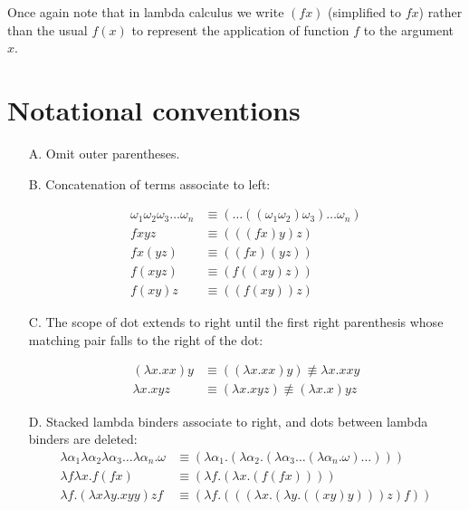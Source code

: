 \documentclass[11pt]{article}
\begin{document}
Once again note that in lambda calculus we write $(f x)$ (simplified to $fx$) rather than the usual $f(x)$
to represent the application of function $f$ to the argument $x$.

\section{Notational conventions}
\label{scnotcon}

\begin{itemize}

\item[A.] Omit outer parentheses.

\item[B.] Concatenation of terms associate to left:    

\begin{align*}
\omega_1\omega_2\omega_3\ldots\omega_n & \equiv (\ldots((\omega_1\omega_2)\omega_3)\ldots\omega_n)\\
fxyz & \equiv   (((fx)y)z)\\
fx(yz) & \equiv   ((fx)(yz))\\
f(xyz) & \equiv   (f((xy)z))\\
f(xy)z & \equiv   ((f(xy))z) 
\end{align*}

\item[C.] The scope of dot extends to right until the first right parenthesis whose matching pair falls to the right of the dot:

\begin{align*}
(\lambda x.xx)y & \equiv ((\lambda x.xx)y) \not\equiv \lambda x.xxy\\
\lambda x.xyz & \equiv (\lambda x.xyz) \not\equiv (\lambda x. x)yz
\end{align*}

\item[D.] Stacked lambda binders associate to right, and dots between lambda binders are deleted:
\begin{align*}
\lambda \alpha_1\lambda \alpha_2\lambda \alpha_3\ldots\lambda \alpha_n.\omega &\equiv (\lambda\alpha_1.(\lambda\alpha_2.(\lambda\alpha_3\ldots(\lambda\alpha_n.\omega)\ldots)))\\
\lambda f \lambda x.f(fx)  &\equiv  (\lambda f.(\lambda x.(f(fx))))\\
\lambda f.(\lambda x\lambda y.xyy)zf & \equiv (\lambda f.(((\lambda x.(\lambda y.((xy)y)))z)f))
\end{align*}

\end{itemize}
\end{document}
